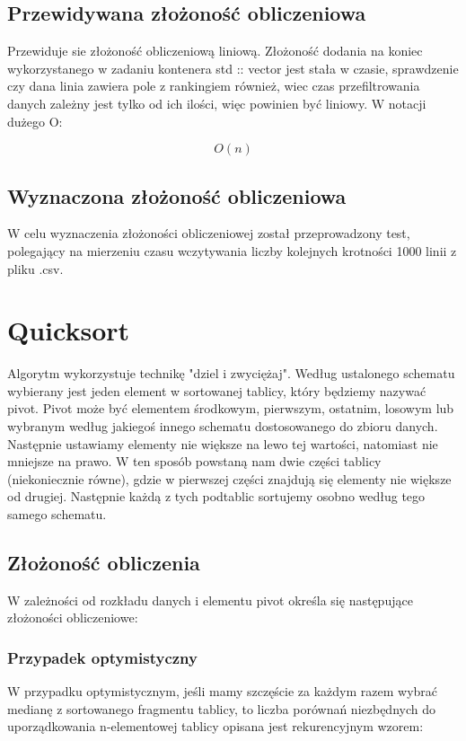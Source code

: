 \documentclass[12pt]{article}
\begin{document}
\subsection{Przewidywana złożoność obliczeniowa}
Przewiduje sie złożoność obliczeniową liniową. Złożoność dodania na koniec wykorzystanego w zadaniu kontenera std :: vector 
jest stała w czasie, sprawdzenie czy dana linia zawiera pole z rankingiem również, wiec czas przefiltrowania danych zależny jest 
tylko od ich ilości, więc powinien być liniowy. W notacji dużego O:

{\Large \begin{equation*}
       O(n)
\end{equation*}}
\subsection{Wyznaczona złożoność obliczeniowa}
W celu wyznaczenia złożoności obliczeniowej został przeprowadzony test, polegający na mierzeniu czasu wczytywania 
liczby kolejnych krotności 1000 linii z pliku .csv.

\section{Quicksort}\label{ch: quicksort}
Algorytm wykorzystuje technikę "dziel i zwyciężaj". Według ustalonego schematu wybierany jest jeden element w 
sortowanej tablicy, który będziemy nazywać pivot. Pivot może być elementem środkowym, pierwszym, ostatnim, losowym 
lub wybranym według jakiegoś innego schematu dostosowanego do zbioru danych. Następnie ustawiamy elementy nie 
większe na lewo tej wartości, natomiast nie mniejsze na prawo. W ten sposób powstaną nam dwie części 
tablicy (niekoniecznie równe), gdzie w pierwszej części znajdują się elementy nie większe od drugiej. 
Następnie każdą z tych podtablic sortujemy osobno według tego samego schematu. 
\subsection{Złożoność obliczenia}
W zależności od rozkładu danych i elementu pivot  określa się następujące złożoności obliczeniowe:
\subsubsection{Przypadek optymistyczny}\label{ch: q optymistyczny}
W przypadku optymistycznym, jeśli mamy szczęście za każdym razem wybrać medianę z sortowanego fragmentu tablicy, to liczba porównań niezbędnych do uporządkowania n-elementowej tablicy opisana jest rekurencyjnym wzorem:
\end{document}
